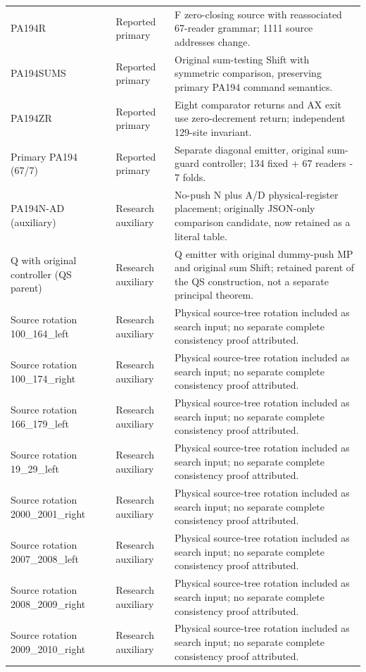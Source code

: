 \begin{longtable}{@{}p{.25\linewidth}p{.17\linewidth}p{.53\linewidth}@{}}
PA194R & Reported primary & F zero-closing source with reassociated 67-reader grammar; 1111 source addresses change. \\
PA194SUMS & Reported primary & Original sum-testing Shift with symmetric comparison, preserving primary PA194 command semantics. \\
PA194ZR & Reported primary & Eight comparator returns and AX exit use zero-decrement return; independent 129-site invariant. \\
Primary PA194 (67/7) & Reported primary & Separate diagonal emitter, original sum-guard controller; 134 fixed + 67 readers - 7 folds. \\
PA194N-AD (auxiliary) & Research auxiliary & No-push N plus A/D physical-register placement; originally JSON-only comparison candidate, now retained as a literal table. \\
Q with original controller (QS parent) & Research auxiliary & Q emitter with original dummy-push MP and original sum Shift; retained parent of the QS construction, not a separate principal theorem. \\
Source rotation 100\_164\_left & Research auxiliary & Physical source-tree rotation included as search input; no separate complete consistency proof attributed. \\
Source rotation 100\_174\_right & Research auxiliary & Physical source-tree rotation included as search input; no separate complete consistency proof attributed. \\
Source rotation 166\_179\_left & Research auxiliary & Physical source-tree rotation included as search input; no separate complete consistency proof attributed. \\
Source rotation 19\_29\_left & Research auxiliary & Physical source-tree rotation included as search input; no separate complete consistency proof attributed. \\
Source rotation 2000\_2001\_right & Research auxiliary & Physical source-tree rotation included as search input; no separate complete consistency proof attributed. \\
Source rotation 2007\_2008\_left & Research auxiliary & Physical source-tree rotation included as search input; no separate complete consistency proof attributed. \\
Source rotation 2008\_2009\_right & Research auxiliary & Physical source-tree rotation included as search input; no separate complete consistency proof attributed. \\
Source rotation 2009\_2010\_right & Research auxiliary & Physical source-tree rotation included as search input; no separate complete consistency proof attributed. \\

\end{longtable}
